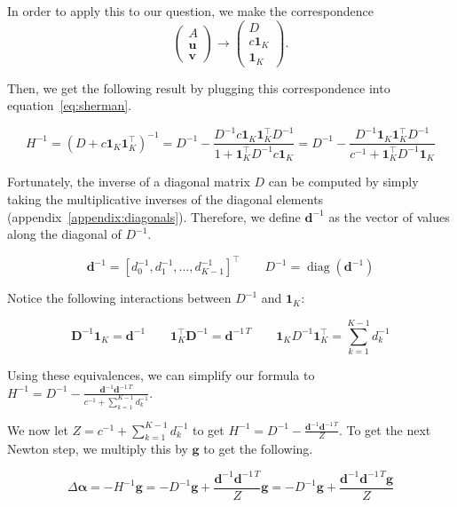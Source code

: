 \documentclass[twoside]{article}
\begin{document}
In order to apply this to our question, we make the correspondence
\[
    \begin{pmatrix}
        A \\
        \boldsymbol{u} \\
        \boldsymbol{v}
    \end{pmatrix}
    \rightarrow
    \begin{pmatrix}
        D \\
        c \boldsymbol{1}_K \\
        \boldsymbol{1}_K
    \end{pmatrix}.
\]

Then, we get the following result by plugging this correspondence into equation~\ref{eq:sherman}.

\[
    H^{-1} = \left(D + c \boldsymbol{1}_K \boldsymbol{1}_K^\top\right)^{-1} = D^{-1} - \frac{D^{-1}c \boldsymbol{1}_K\boldsymbol{1}_K^{\top}D^{-1}}{1 + \boldsymbol{1}_K^{\top}D^{-1}c \boldsymbol{1}_K } = D^{-1} - \frac{D^{-1} \boldsymbol{1}_K\boldsymbol{1}_K^{\top}D^{-1}}{c^{-1} + \boldsymbol{1}_K^{\top}D^{-1} \boldsymbol{1}_K }
\]

Fortunately, the inverse of a diagonal matrix $D$ can be computed by simply taking the multiplicative inverses of the diagonal elements (appendix~\ref{appendix:diagonals}). Therefore, we define $\boldsymbol{d}^{-1}$ as the vector of values along the diagonal of $D^{-1}$.

\[
    \boldsymbol{d}^{-1} = [d_0^{-1}, d_1^{-1}, \dots, d_{K-1}^{-1}]^\top\qquad D^{-1} = \operatorname{diag}(\boldsymbol{d}^{-1})
\]

Notice the following interactions between $D^{-1}$ and $\boldsymbol{1}_K$:
 
\[
\boldsymbol{D}^{-1}\boldsymbol{1}_K = \boldsymbol{d}^{-1} \qquad \boldsymbol{1}_K^\top\boldsymbol{D}^{-1} = \boldsymbol{d}^{-1\,T} \qquad \boldsymbol{1}_KD^{-1}\boldsymbol{1}_K^\top = \sum_{k=1}^{K-1} d_k^{-1}
\]

Using these equivalences, we can simplify our formula to \(H^{-1} = D^{-1} - \frac{\boldsymbol{d}^{-1} \boldsymbol{d}^{-1\,T}}{c^{-1} + \sum_{k=1}^{K-1} d_k^{-1}}.\)

We now let \(Z = c^{-1} + \sum_{k=1}^{K-1} d_k^{-1}\) to get \( H^{-1} = D^{-1} - \frac{\boldsymbol{d}^{-1} \boldsymbol{d}^{-1\,T}}{Z}.\) To get the next Newton step, we multiply this by \(\boldsymbol{g}\) to get the following.

\[
\Delta \boldsymbol{\alpha} = -H^{-1} \boldsymbol{g}= - D^{-1}\boldsymbol{g} + \frac{\boldsymbol{d}^{-1} \boldsymbol{d}^{-1\,T}}{Z}\boldsymbol{g} = - D^{-1} \boldsymbol{g} + \frac{\boldsymbol{d}^{-1} \boldsymbol{d}^{-1\,T}\boldsymbol{g}}{Z}
\]
\end{document}

